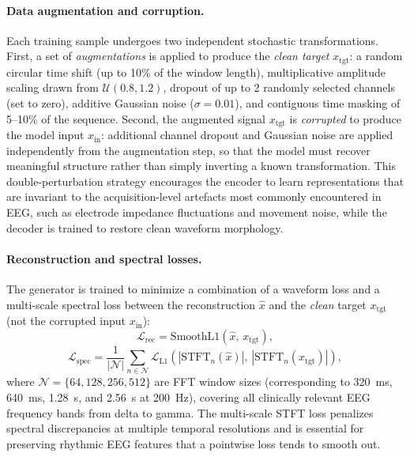 \documentclass{article}
\begin{document}
\paragraph{Data augmentation and corruption.}
Each training sample undergoes two independent stochastic transformations.
First, a set of \emph{augmentations} is applied to produce the \emph{clean target} $x_{\mathrm{tgt}}$: a random circular time shift (up to 10\% of the window length), multiplicative amplitude scaling drawn from $\mathcal{U}(0.8, 1.2)$, dropout of up to 2 randomly selected channels (set to zero), additive Gaussian noise ($\sigma = 0.01$), and contiguous time masking of 5--10\% of the sequence.
Second, the augmented signal $x_{\mathrm{tgt}}$ is \emph{corrupted} to produce the model input $x_{\mathrm{in}}$: additional channel dropout and Gaussian noise are applied independently from the augmentation step, so that the model must recover meaningful structure rather than simply inverting a known transformation.
This double-perturbation strategy encourages the encoder to learn representations that are invariant to the acquisition-level artefacts most commonly encountered in EEG, such as electrode impedance fluctuations and movement noise, while the decoder is trained to restore clean waveform morphology.

\paragraph{Reconstruction and spectral losses.}
The generator is trained to minimize a combination of a waveform loss and a multi-scale spectral loss between the reconstruction $\hat{x}$ and the \emph{clean} target $x_{\mathrm{tgt}}$ (not the corrupted input $x_{\mathrm{in}}$):
\begin{equation}
  \mathcal{L}_{\mathrm{rec}} = \mathrm{SmoothL1}(\hat{x},\, x_{\mathrm{tgt}}),
\end{equation}
\begin{equation}
  \mathcal{L}_{\mathrm{spec}} = \frac{1}{|\mathcal{N}|}\sum_{n \in \mathcal{N}} \mathcal{L}_{\mathrm{L1}}\!\left(|\mathrm{STFT}_n(\hat{x})|,\, |\mathrm{STFT}_n(x_{\mathrm{tgt}})|\right),
\end{equation}
where $\mathcal{N} = \{64, 128, 256, 512\}$ are FFT window sizes (corresponding to 320~ms, 640~ms, 1.28~s, and 2.56~s at 200~Hz), covering all clinically relevant EEG frequency bands from delta to gamma.
The multi-scale STFT loss penalizes spectral discrepancies at multiple temporal resolutions and is essential for preserving rhythmic EEG features that a pointwise loss tends to smooth out.
\end{document}
